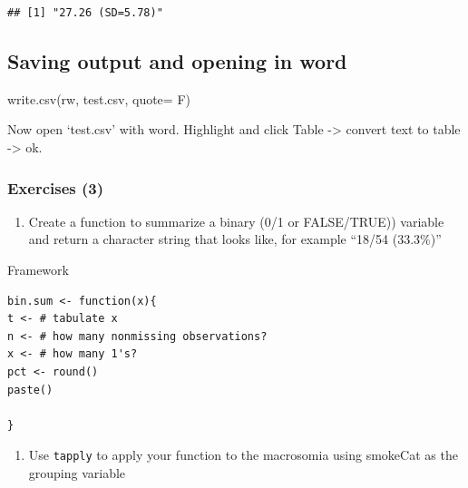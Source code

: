 \documentclass[
]{book}
\newenvironment{Shaded}{\begin{snugshade}}{\end{snugshade}}
\newcommand{\AttributeTok}[1]{\textcolor[rgb]{0.77,0.63,0.00}{#1}}
\newcommand{\FunctionTok}[1]{\textcolor[rgb]{0.00,0.00,0.00}{#1}}
\newcommand{\NormalTok}[1]{#1}
\newcommand{\StringTok}[1]{\textcolor[rgb]{0.31,0.60,0.02}{#1}}
\providecommand{\tightlist}{%
  \setlength{\itemsep}{0pt}\setlength{\parskip}{0pt}}
\begin{document}
\begin{verbatim}
## [1] "27.26 (SD=5.78)"
\end{verbatim}

\hypertarget{saving-output-and-opening-in-word}{%
\subsection*{Saving output and opening in word}\label{saving-output-and-opening-in-word}}

\begin{Shaded}
\begin{Highlighting}[]
\FunctionTok{write.csv}\NormalTok{(rw, }\StringTok{\textquotesingle{}test.csv\textquotesingle{}}\NormalTok{, }\AttributeTok{quote=}\NormalTok{ F)}
\end{Highlighting}
\end{Shaded}

Now open `test.csv' with word. Highlight and click Table -\textgreater{} convert text to table -\textgreater{} ok.

\hypertarget{exercises-3}{%
\subsubsection*{Exercises (3)}\label{exercises-3}}

\begin{enumerate}
\def\labelenumi{\arabic{enumi}.}
\tightlist
\item
  Create a function to summarize a binary (0/1 or FALSE/TRUE)) variable and return a character string that looks like, for example ``18/54 (33.3\%)''
\end{enumerate}

Framework

\begin{verbatim}
bin.sum <- function(x){
t <- # tabulate x
n <- # how many nonmissing observations?
x <- # how many 1's?
pct <- round()
paste()

}
\end{verbatim}

\begin{enumerate}
\def\labelenumi{\arabic{enumi}.}
\setcounter{enumi}{1}
\tightlist
\item
  Use \texttt{tapply} to apply your function to the macrosomia using smokeCat as the grouping variable
\end{enumerate}
\end{document}
